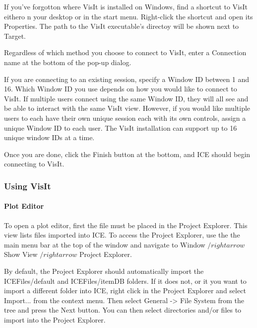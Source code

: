 \documentclass{article}
\begin{document}
If you've forgotton where VisIt is installed on Windows, find a shortcut to
VisIt eithero n your desktop or in the start menu. Right-click the shortcut and
open its Properties. The path to the VisIt executable's directoy will be shown
next to Target.

Regardless of which method you choose to connect to VisIt, enter a Connection
name at the bottom of the pop-up dialog. 

If you are connecting to an existing session, specify a Window ID between 1 and
16. Which Window ID you use depends on how you would like to connect to VisIt.
If multiple users connect using the same Window ID, they will all see and be
able to interact with the same VisIt view. However, if you would like multiple
users to each have their own unique session each with its own controls, assign a
unique Window ID to each user. The VisIt installation can support up to 16
unique window IDs at a time.

Once you are done, click the Finish button at the bottom, and ICE should begin
connecting to VisIt.

\subsubsection{Using VisIt}

\paragraph{Plot Editor}

To open a plot editor, first the file must be placed in the Project Explorer.
This view lists files imported into ICE. To access the Project Explorer, use the
the main menu bar at the top of the window and navigate to Window $/rightarrow$
Show View $/rightarrow$ Project Explorer. 

By default, the Project Explorer should automatically import the
ICEFiles/default and ICEFiles/itemDB folders. If it does not, or it you want to
import a different folder into ICE, right click in the Project Explorer and
select Import... from the context menu. Then select General -> File System from
the tree and press the Next button. You can then select directories and/or files
to import into the Project Explorer.
\end{document}
